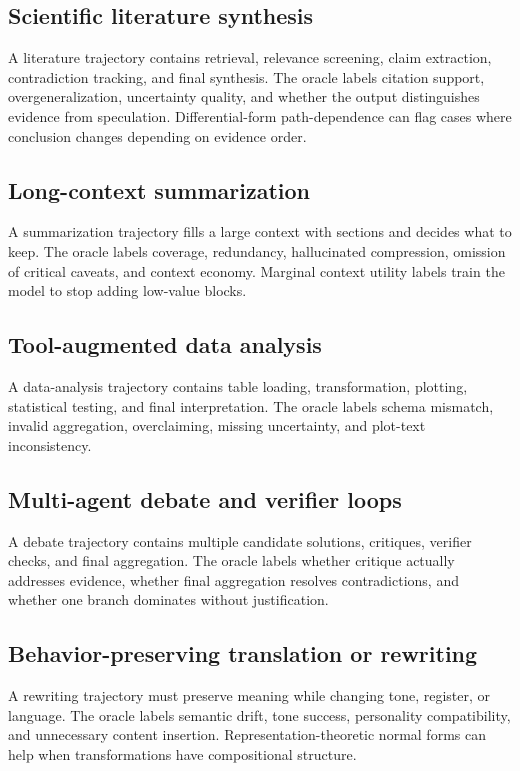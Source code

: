 \documentclass[11pt]{article}
\numberwithin{equation}{section}
\begin{document}
\subsection{Scientific literature synthesis}
A literature trajectory contains retrieval, relevance screening, claim extraction, contradiction tracking, and final synthesis. The oracle labels citation support, overgeneralization, uncertainty quality, and whether the output distinguishes evidence from speculation. Differential-form path-dependence can flag cases where conclusion changes depending on evidence order.

\subsection{Long-context summarization}
A summarization trajectory fills a large context with sections and decides what to keep. The oracle labels coverage, redundancy, hallucinated compression, omission of critical caveats, and context economy. Marginal context utility labels train the model to stop adding low-value blocks.

\subsection{Tool-augmented data analysis}
A data-analysis trajectory contains table loading, transformation, plotting, statistical testing, and final interpretation. The oracle labels schema mismatch, invalid aggregation, overclaiming, missing uncertainty, and plot-text inconsistency.

\subsection{Multi-agent debate and verifier loops}
A debate trajectory contains multiple candidate solutions, critiques, verifier checks, and final aggregation. The oracle labels whether critique actually addresses evidence, whether final aggregation resolves contradictions, and whether one branch dominates without justification.

\subsection{Behavior-preserving translation or rewriting}
A rewriting trajectory must preserve meaning while changing tone, register, or language. The oracle labels semantic drift, tone success, personality compatibility, and unnecessary content insertion. Representation-theoretic normal forms can help when transformations have compositional structure.
\end{document}
